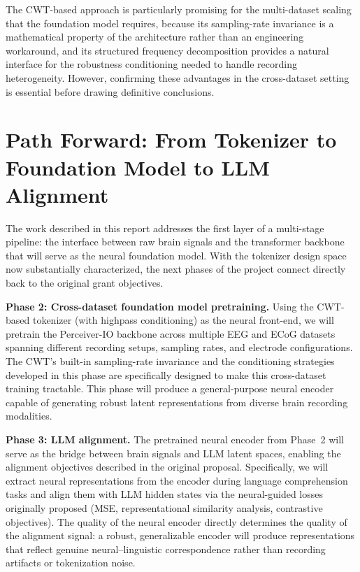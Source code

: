 \documentclass[11pt, a4paper]{article}
\begin{document}
The CWT-based approach is particularly promising for the multi-dataset scaling that the foundation model requires, because its sampling-rate invariance is a mathematical property of the architecture rather than an engineering workaround, and its structured frequency decomposition provides a natural interface for the robustness conditioning needed to handle recording heterogeneity. However, confirming these advantages in the cross-dataset setting is essential before drawing definitive conclusions.


\section{Path Forward: From Tokenizer to Foundation Model to LLM Alignment}
\label{sec:path-forward}

The work described in this report addresses the first layer of a multi-stage pipeline: the interface between raw brain signals and the transformer backbone that will serve as the neural foundation model. With the tokenizer design space now substantially characterized, the next phases of the project connect directly back to the original grant objectives.

\textbf{Phase 2: Cross-dataset foundation model pretraining.} Using the CWT-based tokenizer (with highpass conditioning) as the neural front-end, we will pretrain the Perceiver-IO backbone across multiple EEG and ECoG datasets spanning different recording setups, sampling rates, and electrode configurations. The CWT's built-in sampling-rate invariance and the conditioning strategies developed in this phase are specifically designed to make this cross-dataset training tractable. This phase will produce a general-purpose neural encoder capable of generating robust latent representations from diverse brain recording modalities.

\textbf{Phase 3: LLM alignment.} The pretrained neural encoder from Phase~2 will serve as the bridge between brain signals and LLM latent spaces, enabling the alignment objectives described in the original proposal. Specifically, we will extract neural representations from the encoder during language comprehension tasks and align them with LLM hidden states via the neural-guided losses originally proposed (MSE, representational similarity analysis, contrastive objectives). The quality of the neural encoder directly determines the quality of the alignment signal: a robust, generalizable encoder will produce representations that reflect genuine neural--linguistic correspondence rather than recording artifacts or tokenization noise.
\end{document}
